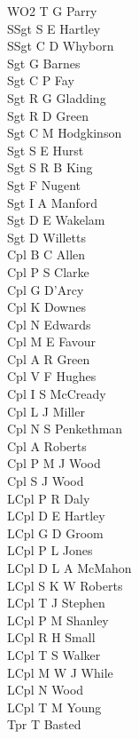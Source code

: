 \begin{multicols}{2}
  \small
  \noindent
  WO2 T G Parry \\
  SSgt S E Hartley \\
  SSgt C D Whyborn \\
  Sgt G Barnes \\
  Sgt C P Fay \\
  Sgt R G Gladding \\
  Sgt R D Green \\
  Sgt C M Hodgkinson \\
  Sgt S E Hurst \\
  Sgt S R B King \\
  Sgt F Nugent \\
  Sgt I A Manford \\
  Sgt D E Wakelam \\
  Sgt D Willetts \\
  Cpl B C Allen \\
  Cpl P S Clarke \\
  Cpl G D'Arcy \\
  Cpl K Downes \\
  Cpl N Edwards \\
  Cpl M E Favour \\
  Cpl A R Green \\
  Cpl V F Hughes \\
  Cpl I S McCready \\
  Cpl L J Miller \\
  Cpl N S Penkethman \\
  Cpl A Roberts \\
  Cpl P M J Wood \\
  Cpl S J Wood \\
  LCpl P R Daly \\
  LCpl D E Hartley \\
  LCpl G D Groom \\
  LCpl P L Jones \\
  LCpl D L A McMahon \\
  LCpl S K W Roberts \\
  LCpl T J Stephen \\
  LCpl P M Shanley \\
  LCpl R H Small \\
  LCpl T S Walker \\
  LCpl M W J While \\
  LCpl N Wood \\
  LCpl T M Young \\
  Tpr T Basted \\

\end{multicols}
